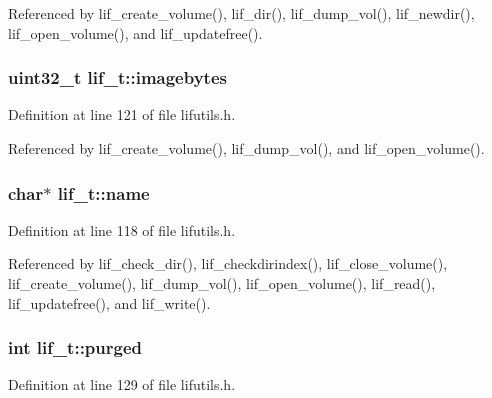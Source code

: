 Referenced by lif\+\_\+create\+\_\+volume(), lif\+\_\+dir(), lif\+\_\+dump\+\_\+vol(), lif\+\_\+newdir(), lif\+\_\+open\+\_\+volume(), and lif\+\_\+updatefree().

\subsubsection[{\texorpdfstring{imagebytes}{imagebytes}}]{\setlength{\rightskip}{0pt plus 5cm}uint32\+\_\+t lif\+\_\+t\+::imagebytes}\hypertarget{structlif__t_afabd64e66adb03eef2249b6c627faac7}{}\label{structlif__t_afabd64e66adb03eef2249b6c627faac7}


Definition at line 121 of file lifutils.\+h.



Referenced by lif\+\_\+create\+\_\+volume(), lif\+\_\+dump\+\_\+vol(), and lif\+\_\+open\+\_\+volume().

\subsubsection[{\texorpdfstring{name}{name}}]{\setlength{\rightskip}{0pt plus 5cm}char$\ast$ lif\+\_\+t\+::name}\hypertarget{structlif__t_ae6b943f3c26005fc375169960e9049f7}{}\label{structlif__t_ae6b943f3c26005fc375169960e9049f7}


Definition at line 118 of file lifutils.\+h.



Referenced by lif\+\_\+check\+\_\+dir(), lif\+\_\+checkdirindex(), lif\+\_\+close\+\_\+volume(), lif\+\_\+create\+\_\+volume(), lif\+\_\+dump\+\_\+vol(), lif\+\_\+open\+\_\+volume(), lif\+\_\+read(), lif\+\_\+updatefree(), and lif\+\_\+write().

\subsubsection[{\texorpdfstring{purged}{purged}}]{\setlength{\rightskip}{0pt plus 5cm}int lif\+\_\+t\+::purged}\hypertarget{structlif__t_a1dfef3ca99d6ba9680bb9b6bf8fafc32}{}\label{structlif__t_a1dfef3ca99d6ba9680bb9b6bf8fafc32}


Definition at line 129 of file lifutils.\+h.



